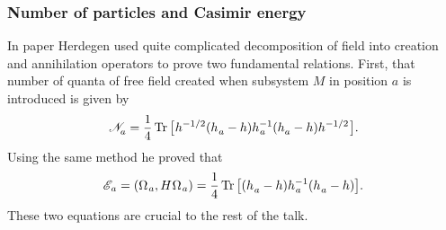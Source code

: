 \documentclass[10pt,t]{beamer}
\begin{document}
















\begin{frame}
  \frametitle{Number of particles and Casimir energy}


  In paper \parencite{Herdegen-Quantum-backreaction-ETC-Part-I-Pub-2005}
  Herdegen used quite complicated decomposition of field into creation
  and annihilation operators to prove two fundamental relations. First, that
  number of quanta of \alert{free} field created when subsystem $M$ in
  position $a$ is introduced is given by
  \begin{equation}
    \label{eq:Construction-of-quasi-free-system-ETC-03}
    \mathcal{N}_{ a }^{ \vphantom{1} } =
    \frac{ 1 }{ 4 } \operatorname{Tr}\big[ \hspace{0.05em} h^{ -1/2 } (
    h_{ \hspace{0.05em} a }^{ \vphantom{1} } - h ) h_{ \hspace{0.05em} a }^{ -1 }
    ( h_{ a }^{ \vphantom{1} } - h ) h^{ -1/2 } \hspace{0.07em} \big].
  \end{equation}
  Using the same method he proved that
  \begin{equation}
    \label{eq:Construction-of-quasi-free-system-ETC-04}
    \mathcal{E}_{ \hspace{0.07em} a } =
    ( \Omega_{ \hspace{0.07em} a }, H \hspace{0.05em} \Omega_{ \hspace{0.07em} a } ) =
    \frac{ 1 }{ 4 }
    \operatorname{Tr}\big[ ( h_{ \hspace{0.05em} a }^{ \vphantom{1} } - h )
    h_{ \hspace{0.05em} a }^{ -1 }
    ( h_{ \hspace{0.05em} a }^{ \vphantom{1} } - h ) \big].
  \end{equation}
  These two equations are crucial to the rest of the talk.

\end{frame}
\end{document}
